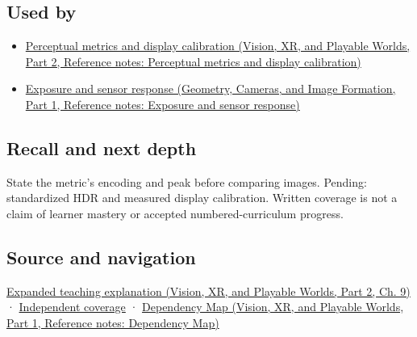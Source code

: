 \subsection{Used by}\label{appendix-a9f83ad40792-used-by}

\hypertarget{appendix-a9f83ad40792-used-by}{}

\begin{itemize}
\tightlist
\item
  \href{../07-Vision-XR-and-Playable-Worlds-P02/main.pdf\#nameddest=appendix-b2c1846508bf}{Perceptual metrics and display calibration (Vision, XR, and Playable Worlds, Part 2, Reference notes: Perceptual metrics and display calibration)}
\item
  \href{../03-Geometry-Cameras-and-Image-Formation-P01/main.pdf\#nameddest=appendix-92d45cdf2afc}{Exposure and sensor response (Geometry, Cameras, and Image Formation, Part 1, Reference notes: Exposure and sensor response)}
\end{itemize}

\subsection{Recall and next depth}\label{appendix-a9f83ad40792-recall-and-next-depth}

\hypertarget{appendix-a9f83ad40792-recall-and-next-depth}{}

State the metric's encoding and peak before comparing images. Pending: standardized HDR and measured display calibration. Written coverage is not a claim of learner mastery or accepted numbered-curriculum progress.

\subsection{Source and navigation}\label{appendix-a9f83ad40792-source-and-navigation}

\hypertarget{appendix-a9f83ad40792-source-and-navigation}{}

\href{../07-Vision-XR-and-Playable-Worlds-P02/main.pdf\#nameddest=04-visual-computing-ii-ch042-encoded-rgb-must-not-masquerade-as-linear-light}{Expanded teaching explanation (Vision, XR, and Playable Worlds, Part 2, Ch. 9)} · \hyperref[appendix-fd090d982a15-xr01---independent-seeing-and-representation-source]{Independent coverage} · \href{../07-Vision-XR-and-Playable-Worlds-P01/main.pdf\#nameddest=appendix-4ad47bdd269a}{Dependency Map (Vision, XR, and Playable Worlds, Part 1, Reference notes: Dependency Map)}

